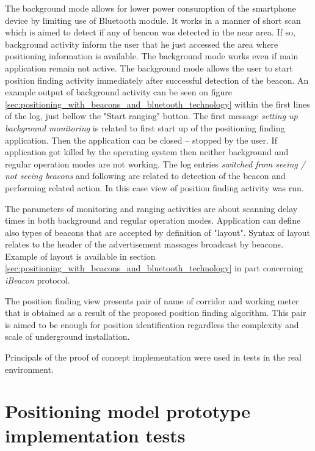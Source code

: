 \documentclass[../main.tex]{subfiles}
\begin{document}
The background mode allows for lower power consumption of the smartphone device by limiting use of Bluetooth module. It works in a manner of short scan which is aimed to detect if any of beacon was detected in the near area. If so, background activity inform the user that he just accessed the area where positioning information is available. The background mode works even if main application remain not active. The background mode allows the user to start position finding activity immediately after successful detection of the beacon. An example output of background activity can be seen on figure \ref{sec:positioning_with_beacons_and_bluetooth_technology} within the first lines of the log, just bellow the "Start ranging" button. The first message \textit{setting up background monitoring} is related to first start up of the positioning finding application. Then the application can be closed -- stopped by the user. If application got killed by the operating system then neither background and regular operation modes are not working. The log entries \textit{switched from seeing / not seeing beacons} and following are related to detection of the beacon and performing related action. In this case view of position finding activity was run.

The parameters of monitoring and ranging activities are about scanning delay times in both background and regular operation modes. Application can define also types of beacons that are accepted by definition of "layout". Syntax of layout relates to the header of the advertisement massages broadcast by beacons. Example of layout is available in section \ref{sec:positioning_with_beacons_and_bluetooth_technology} in part concerning \textit{iBeacon} protocol.

The position finding view presents pair of name of corridor and working meter that is obtained as a result of the proposed position finding algorithm. This pair is aimed to be enough for position identification regardless the complexity and scale of underground installation.

Principals of the proof of concept implementation were used in tests in the real environment.


\chapter{Positioning model prototype implementation tests}
\label{ch:localization_system_tests}
\end{document}
